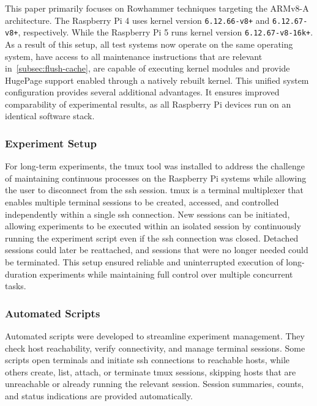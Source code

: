     This paper primarily focuses on Rowhammer techniques targeting the ARMv8-A architecture. The Raspberry 
    Pi 4 uses kernel version \texttt{6.12.66-v8+} and \texttt{6.12.67-v8+}, respectively. While the Raspberry Pi 5 runs kernel version \texttt{6.12.67-v8-16k+}. As a 
    result of this setup, all test systems now operate on the same operating system, have access to all maintenance 
    instructions that are relevant in~\cref{subsec:flush-cache}, are capable of executing kernel modules
    and provide HugePage support enabled through a natively rebuilt kernel. This unified system configuration provides 
    several additional advantages. It ensures improved comparability of experimental results, as all Raspberry Pi devices 
    run on an identical software stack.

  \subsubsection{Experiment Setup} \label{subsubsec:experiment-setup}
    For long-term experiments, the \gls{tmux} tool was installed to address the challenge of maintaining continuous processes on the 
    Raspberry Pi systems while allowing the user to disconnect from the \gls{ssh} session. \gls{tmux} is a terminal multiplexer that enables 
    multiple terminal sessions to be created, accessed, and controlled independently within a single \gls{ssh} connection. New 
    sessions can be initiated, allowing experiments to be executed within an isolated session by continuously running the experiment 
    script even if the \gls{ssh} connection was closed. Detached sessions could later be reattached, and 
    sessions that were no longer needed could be terminated. This setup ensured reliable 
    and uninterrupted execution of long-duration experiments while maintaining full control over multiple concurrent tasks.
  
  \subsubsection{Automated Scripts} \label{subsubsec:automated-scripts}
    Automated scripts were developed to streamline experiment management. They check host reachability, verify connectivity, 
    and manage terminal sessions. Some scripts open terminals and initiate \gls{ssh} connections to reachable hosts, 
    while others create, list, attach, or terminate \gls{tmux} sessions, skipping hosts that are unreachable or 
    already running the relevant session. Session summaries, counts, and status indications are provided automatically.
    
